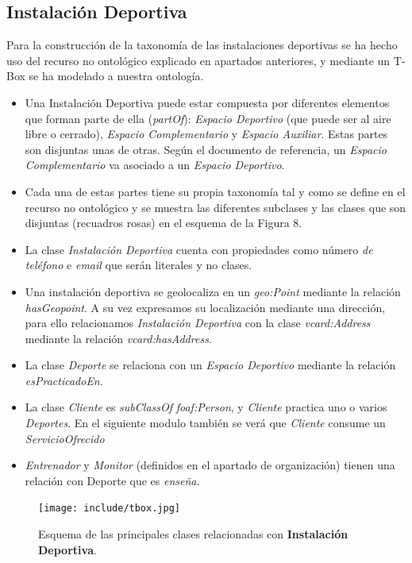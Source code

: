 \documentclass[a4paper,12pt]{article}
\begin{document}
	\subsection{Instalación Deportiva}
	
	Para la construcción de la taxonomía de las instalaciones deportivas se ha hecho uso del recurso no ontológico explicado en apartados anteriores, y mediante un T-Box se ha modelado a nuestra ontología.
	
	\begin{itemize}
		\item Una Instalación Deportiva puede estar compuesta por diferentes elementos que forman parte de ella (\textit{partOf}): \textit{Espacio Deportivo} (que puede ser al aire libre o cerrado), \textit{Espacio Complementario} y \textit{Espacio Auxiliar}. Estas partes son disjuntas unas de otras. Según el documento de referencia, un \textit{Espacio Complementario} va asociado a un \textit{Espacio Deportivo}.
		\item Cada una de estas partes tiene su propia taxonomía tal y como se define en el recurso no ontológico y se muestra las diferentes subclases y las clases que son disjuntas (recuadros rosas) en el esquema de la Figura 8.
		\item La clase \textit{Instalación Deportiva} cuenta con propiedades como número\textit{ de teléfono} e \textit{email} que serán literales y no clases.
		\item Una instalación deportiva se geolocaliza en un \textit{geo:Point} mediante la relación \textit{hasGeopoint}. A su vez expresamos su localización mediante una dirección, para ello relacionamos \textit{Instalación Deportiva} con la clase \textit{vcard:Address} mediante la relación \textit{vcard:hasAddress}.
		\item La clase \textit{Deporte} se relaciona con un \textit{Espacio Deportivo} mediante la relación \textit{esPracticadoEn}.
		\item La clase \textit{Cliente} es \textit{subClassOf} \textit{foaf:Person}, y \textit{Cliente} practica uno o varios \textit{Deportes}. En el siguiente modulo también se verá que \textit{Cliente} consume un \textit{ServicioOfrecido}
		\item \textit{Entrenador} y \textit{Monitor} (definidos en el apartado de organización) tienen una relación con Deporte que es \textit{enseña}.
	\end{itemize}

	\begin{figure}[H]
		\centering
		\texttt{[image: include/tbox.jpg]}
		\caption{Esquema de las principales clases relacionadas con \textbf{Instalación Deportiva}.}
	\end{figure}
		
\end{document}
